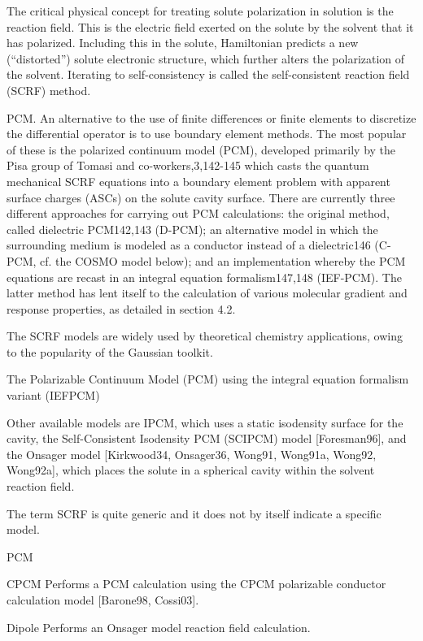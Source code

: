 The critical physical concept for treating solute polarization in
solution is the reaction field. This is the electric
field exerted on the solute by the solvent that it has polarized. Including
this in the solute, Hamiltonian predicts a new (“distorted”) solute
electronic structure, which further alters the polarization of the
solvent. Iterating to self-consistency is called the self-consistent
reaction field (SCRF) method. \citep{Cramer_1999_implicit_model}

PCM. An alternative to the use of finite differences or finite elements
to discretize the differential operator is to use boundary element
methods. The most popular of these is the polarized continuum model
(PCM), developed primarily by the Pisa group of Tomasi and co-workers,3,142-145
which casts the quantum mechanical SCRF equations into a boundary
element problem with apparent surface charges (ASCs) on the solute
cavity surface. There are currently three different approaches for
carrying out PCM calculations: the original method, called dielectric
PCM142,143 (D-PCM); an alternative model in which the surrounding
medium is modeled as a conductor instead of a dielectric146 (C-PCM,
cf. the COSMO model below); and an implementation whereby the PCM
equations are recast in an integral equation formalism147,148 (IEF-PCM).
The latter method has lent itself to the calculation of various molecular
gradient and response properties, as detailed in section 4.2.

The SCRF models \citep{Jensen,scrf}
are widely used by theoretical chemistry applications, owing to the
popularity of the Gaussian toolkit. 

The Polarizable Continuum Model (PCM) using the integral equation
formalism variant (IEFPCM) 

Other available models are IPCM, which uses a static isodensity surface
for the cavity, the Self-Consistent Isodensity PCM (SCIPCM) model {[}Foresman96{]},
and the Onsager model {[}Kirkwood34, Onsager36, Wong91, Wong91a, Wong92,
Wong92a{]}, which places the solute in a spherical cavity within the
solvent reaction field.

The term SCRF is quite generic and it does not by itself indicate
a specific model.

PCM

CPCM Performs a PCM calculation using the CPCM polarizable conductor
calculation model {[}Barone98, Cossi03{]}.

Dipole Performs an Onsager model reaction field calculation.

